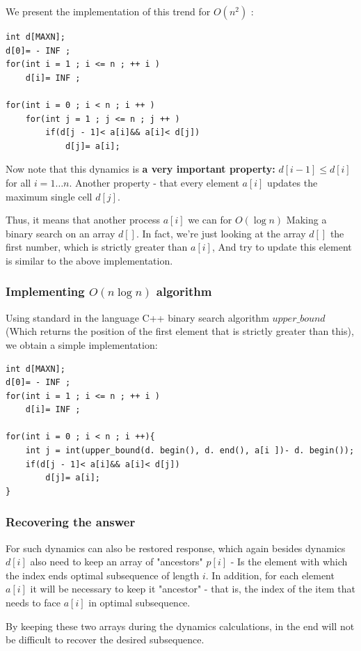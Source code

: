We present the implementation of this trend for $O (n ^ 2)$ :

\begin{verbatim}
int d[MAXN];
d[0]= - INF ;
for(int i = 1 ; i <= n ; ++ i )
    d[i]= INF ;
 
for(int i = 0 ; i < n ; i ++ )
    for(int j = 1 ; j <= n ; j ++ )
        if(d[j - 1]< a[i]&& a[i]< d[j])
            d[j]= a[i]; 
\end{verbatim}
Now note that this dynamics is \textbf{a very important property:} $d [i-1] \le d [i]$ for all $i = 1 \ldots n$. Another property - that every element $a [i]$ updates the maximum single cell $d [j]$.

Thus, it means that another process $a [i]$ we can for $O (\log n)$ Making a binary search on an array $d []$. In fact, we're just looking at the array $d []$ the first number, which is strictly greater than $a [i]$, And try to update this element is similar to the above implementation.

\subsubsection{ Implementing $O (n \log n)$ algorithm }

Using standard in the language C++ binary search algorithm $upper \_bound$ (Which returns the position of the first element that is strictly greater than this), we obtain a simple implementation:

\begin{verbatim}
int d[MAXN];
d[0]= - INF ;
for(int i = 1 ; i <= n ; ++ i )
    d[i]= INF ;
 
for(int i = 0 ; i < n ; i ++){
    int j = int(upper_bound(d. begin(), d. end(), a[i ])- d. begin());
    if(d[j - 1]< a[i]&& a[i]< d[j])
        d[j]= a[i];
} 
\end{verbatim}
\subsubsection{ Recovering the answer }

For such dynamics can also be restored response, which again besides dynamics $d [i]$ also need to keep an array of "ancestors" $p [i]$ - Is the element with which the index ends optimal subsequence of length $i$. In addition, for each element $a [i]$ it will be necessary to keep it "ancestor" - that is, the index of the item that needs to face $a [i]$ in optimal subsequence.

By keeping these two arrays during the dynamics calculations, in the end will not be difficult to recover the desired subsequence.

